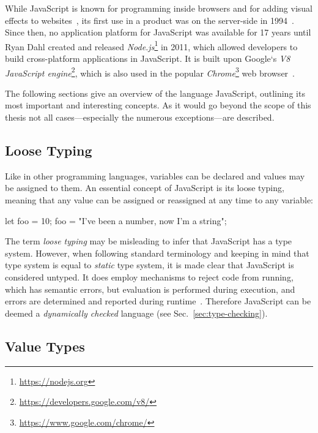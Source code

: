 While JavaScript is known for programming inside browsers and for adding visual effects to websites~\cite[p.~4]{JavaScriptObjectProgramming:Rinehart:2015}, its first use in a product was on the server-side in 1994~\cite[p.~369]{ProJavaScriptDevelopment:Odell:2014}. Since then, no application platform for JavaScript was available for 17 years until Ryan Dahl created and released \emph{Node.js}\footnote{\url{https://nodejs.org}} in 2011, which allowed developers to build cross-platform applications in JavaScript. It is built upon Google`s \emph{V8 JavaScript engine}\footnote{\url{https://developers.google.com/v8/}}, which is also used in the popular \emph{Chrome}\footnote{\url{https://www.google.com/chrome/}} web browser~\cite[p.~369]{ProJavaScriptDevelopment:Odell:2014}.

\noindent
The following sections give an overview of the language JavaScript, outlining its most important and interesting concepts. As it would go beyond the scope of this thesis not all cases---especially the numerous exceptions---are described.

\subsection{Loose Typing}
\label{sec:untyped-loosely-typed}

Like in other programming languages, variables can be declared and values may be assigned to them. An essential concept of JavaScript is its loose typing, meaning that any value can be assigned or reassigned at any time to any variable:
\begin{JsCode}[numbers=none]
let foo = 10;
foo = "I've been a number, now I'm a string";
\end{JsCode}
The term \emph{loose typing} may be misleading to infer that JavaScript has a type system. However, when following standard terminology and keeping in mind that type system is equal to \emph{static} type system, it is made clear that JavaScript is considered untyped. It does employ mechanisms to reject code from running, which has semantic errors, but evaluation is performed during execution, and errors are determined and reported during runtime~\cite[p.~291]{ES6Spec:Ecma:2015}. Therefore JavaScript can be deemed a \emph{dynamically checked} language (see Sec.~\ref{sec:type-checking}).

\subsection{Value Types}
\label{sec:value-types}

